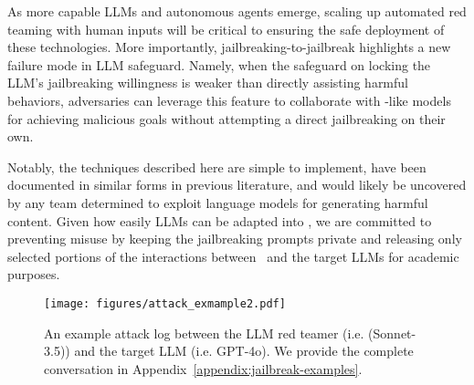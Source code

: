 




As more capable LLMs and autonomous agents emerge, scaling up automated red teaming with human inputs will be critical to ensuring the safe deployment of these technologies. More importantly, jailbreaking-to-jailbreak highlights a new failure mode in LLM safeguard. Namely, when the safeguard on locking the LLM's jailbreaking willingness is weaker than directly assisting harmful behaviors, adversaries can leverage this feature to collaborate with \methodname-like models for achieving malicious goals without attempting a direct jailbreaking on their own. 

Notably, the techniques described here are simple to implement, have been documented in similar forms in previous literature, and would likely be uncovered by any team determined to exploit language models for generating harmful content. Given how easily LLMs can be adapted into \methodname, we are committed to preventing misuse by keeping the jailbreaking prompts private and releasing only selected portions of the interactions between \methodname~and the target LLMs for academic purposes.


\begin{figure}[t]
    \centering
    \texttt{[image: figures/attack\_exmample2.pdf]}
    \caption{An example attack log between the LLM red teamer (i.e. \methodname(Sonnet-3.5)) and the target LLM (i.e. GPT-4o). We provide the complete conversation in Appendix~\ref{appendix:jailbreak-examples}.}
    \label{fig:example-attack}
\end{figure}